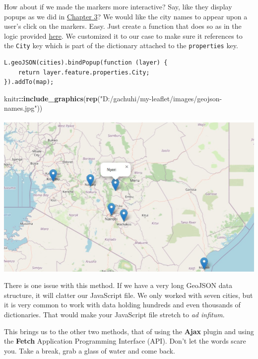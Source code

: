 \documentclass[
]{book}
\newenvironment{Shaded}{\begin{snugshade}}{\end{snugshade}}
\newcommand{\FunctionTok}[1]{\textcolor[rgb]{0.13,0.29,0.53}{\textbf{#1}}}
\newcommand{\NormalTok}[1]{#1}
\newcommand{\SpecialCharTok}[1]{\textcolor[rgb]{0.81,0.36,0.00}{\textbf{#1}}}
\newcommand{\StringTok}[1]{\textcolor[rgb]{0.31,0.60,0.02}{#1}}
\begin{document}
How about if we made the markers more interactive? Say, like they display popups as we did in \protect\hyperlink{a-marker-with-a-popup}{Chapter 3}? We would like the city names to appear upon a user's click on the markers. Easy. Just create a function that does so as in the logic provided \href{https://leafletjs.com/reference.html\#geojson}{here}. We customized it to our case to make sure it references to the \texttt{City} key which is part of the dictionary attached to the \texttt{properties} key.

\begin{verbatim}
L.geoJSON(cities).bindPopup(function (layer) {
    return layer.feature.properties.City;
}).addTo(map);
\end{verbatim}

\begin{Shaded}
\begin{Highlighting}[]
\NormalTok{knitr}\SpecialCharTok{::}\FunctionTok{include\_graphics}\NormalTok{(}\FunctionTok{rep}\NormalTok{(}\StringTok{"D:/gachuhi/my{-}leaflet/images/geojson{-}names.jpg"}\NormalTok{))}
\end{Highlighting}
\end{Shaded}

\includegraphics{../images/geojson-names.jpg}

There is one issue with this method. If we have a very long GeoJSON data structure, it will clatter our JavaScript file. We only worked with seven cities, but it is very common to work with data holding hundreds and even thousands of dictionaries. That would make your JavaScript file stretch to \emph{ad infitum}.

This brings us to the other two methods, that of using the \textbf{Ajax} plugin and using the \textbf{Fetch} Application Programming Interface (API). Don't let the words scare you. Take a break, grab a glass of water and come back.
\end{document}
